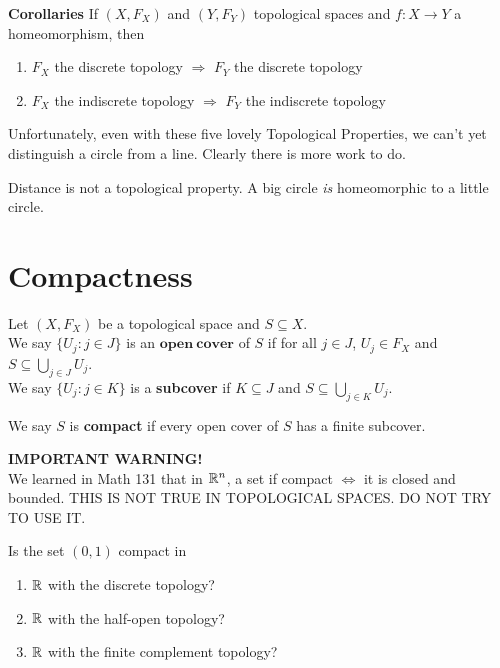 {\bf Corollaries} If $(X, F_X) $ and $(Y, F_Y)$ topological spaces and $f: X \rightarrow Y$ a homeomorphism, then 
\begin{enumerate}
	\item $F_X$ the discrete topology $\Longrightarrow$ $F_Y$ the discrete topology 
	\item $F_X$ the indiscrete topology $\Longrightarrow$ $F_Y$ the indiscrete topology 
\end{enumerate}

Unfortunately, even with these five lovely Topological Properties, we can't yet distinguish a circle from a line. Clearly there is more work to do.
\begin{example}
	Distance is not a topological property. A big circle \emph{is} homeomorphic to a little circle. 
\end{example}

\section{Compactness}
\begin{definition}
	Let $(X, F_X)$ be a topological space and $S \subseteq X$.\\
	We say $\{U_j : j \in J\}$ is an $\mathbf{open \ cover}$ of $S$ if for all $j \in J$, $U_j \in F_X$ and $S \subseteq \bigcup_{j \in J}U_j$.\\
	We say $\{U_j : j \in K\}$ is a {\bf subcover} if $K \subseteq J$ and $S \subseteq \bigcup_{j \in K} U_j$.
	
	We say $S$ is {\bf compact} if every open cover of $S$ has a finite subcover. 
\end{definition}

{\bf IMPORTANT WARNING!}\\
We learned in Math 131 that in $\mathbb R^{n}$, a set if compact $\Longleftrightarrow$ it is closed and bounded. THIS IS NOT TRUE IN TOPOLOGICAL SPACES. DO NOT TRY TO USE IT.
\begin{example}
	Is the set $(0,1)$ compact in 
	\begin{enumerate}
		\item $\mathbb R$ with the discrete topology? 
		\item $\mathbb R$ with the half-open topology? 
		\item $\mathbb R$ with the finite complement topology? 
	\end{enumerate}
\end{example}

